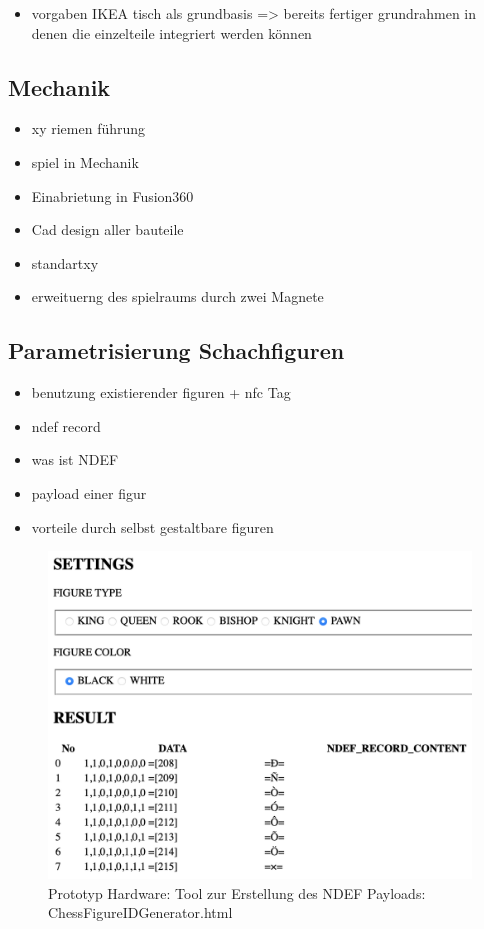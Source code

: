 \begin{itemize}
\tightlist
\item
  vorgaben IKEA tisch als grundbasis =\textgreater{} bereits fertiger
  grundrahmen in denen die einzelteile integriert werden können
\end{itemize}

\hypertarget{mechanik}{%
\subsection{Mechanik}\label{mechanik}}

\begin{itemize}
\tightlist
\item
  xy riemen führung
\item
  spiel in Mechanik
\item
  Einabrietung in Fusion360
\item
  Cad design aller bauteile
\item
  standartxy
\item
  erweituerng des spielraums durch zwei Magnete
\end{itemize}

\hypertarget{parametrisierung-schachfiguren}{%
\subsection{Parametrisierung
Schachfiguren}\label{parametrisierung-schachfiguren}}

\begin{itemize}
\tightlist
\item
  benutzung existierender figuren + nfc Tag
\item
  ndef record
\item
  was ist NDEF
\item
  payload einer figur
\item
  vorteile durch selbst gestaltbare figuren
\end{itemize}

\begin{figure}
\centering
\includegraphics{images/ATC_ChessFigureIDGenerator.png}
\caption{Prototyp Hardware: Tool zur Erstellung des NDEF Payloads:
ChessFigureIDGenerator.html}
\end{figure}

